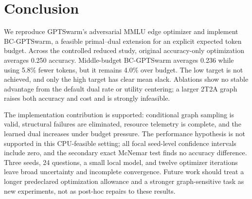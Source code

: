 \section{Conclusion}

We reproduce GPTSwarm's adversarial MMLU edge optimizer and implement BC-GPTSwarm, a feasible primal--dual extension for an explicit expected token budget. Across the controlled reduced study, original accuracy-only optimization averages 0.250 accuracy. Middle-budget BC-GPTSwarm averages 0.236 while using 5.8\% fewer tokens, but it remains 4.0\% over budget. The low target is not achieved, and only the high target has clear mean slack. Ablations show no stable advantage from the default dual rate or utility centering; a larger 2T2A graph raises both accuracy and cost and is strongly infeasible.

The implementation contribution is supported: conditional graph sampling is valid, structural failures are eliminated, resource telemetry is complete, and the learned dual increases under budget pressure. The performance hypothesis is not supported in this CPU-feasible setting; all focal seed-level confidence intervals include zero, and the secondary exact McNemar test finds no accuracy difference. Three seeds, 24 questions, a small local model, and twelve optimizer iterations leave broad uncertainty and incomplete convergence. Future work should treat a longer predeclared optimization allowance and a stronger graph-sensitive task as new experiments, not as post-hoc repairs to these results.
